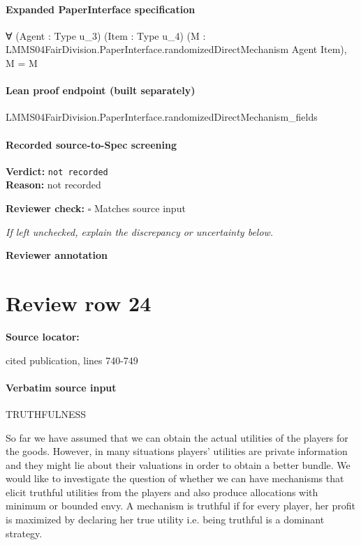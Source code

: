 \documentclass[10pt]{article}
\newcommand{\reviewerbox}{%
  \par\noindent\fbox{\parbox{0.96\linewidth}{\rule{0pt}{0.38in}}}\par
}
\newcommand{\reviewmatch}[1]{%
  \par\noindent\textbf{Reviewer check:} $\square$\; #1\par
  \noindent\emph{If left unchecked, explain the discrepancy or uncertainty below.}\par
}
\begin{document}
\paragraph{Expanded PaperInterface specification}
\begin{ReviewVerbatim}
∀ (Agent : Type u_3) (Item : Type u_4) (M : LMMS04FairDivision.PaperInterface.randomizedDirectMechanism Agent Item),
  M = M
\end{ReviewVerbatim}

\paragraph{Lean proof endpoint (built separately)}\begin{ReviewVerbatim}
LMMS04FairDivision.PaperInterface.randomizedDirectMechanism_fields
\end{ReviewVerbatim}

\paragraph{Recorded source-to-Spec screening}
\textbf{Verdict:} \texttt{not recorded}
\\
\textbf{Reason:} not recorded
\reviewmatch{Matches source input}
\noindent\textbf{Reviewer annotation}\par
\reviewerbox
\clearpage
\hypertarget{source-claim-dde6f174675622fe}{}
\section*{Review row 24}
\textbf{Source locator:} {\footnotesize\raggedright cited publication, lines 740-\allowbreak{}749\par}
\paragraph{Verbatim source input}
\begin{ReviewVerbatim}
TRUTHFULNESS

So far we have assumed that we can obtain the actual
utilities of the players for the goods. However, in many situations players’ utilities are private information and they
might lie about their valuations in order to obtain a better
bundle. We would like to investigate the question of whether
we can have mechanisms that elicit truthful utilities from
the players and also produce allocations with minimum or
bounded envy. A mechanism is truthful if for every player,
her profit is maximized by declaring her true utility i.e. being truthful is a dominant strategy.
\end{ReviewVerbatim}
\end{document}
